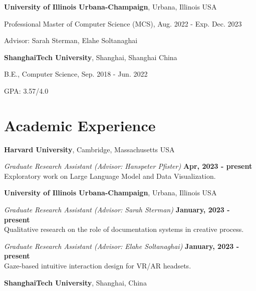 \documentclass[margin,line]{res}
\newenvironment{list1}{
  \begin{list}{\ding{113}}{%
      \setlength{\itemsep}{0in}
      \setlength{\parsep}{0in} \setlength{\parskip}{0in}
      \setlength{\topsep}{0in} \setlength{\partopsep}{0in} 
      \setlength{\leftmargin}{0.17in}}}{\end{list}}
\begin{document}
\begin{resume}
{\bf University of Illinois Urbana-Champaign}, Urbana, Illinois USA\\
\vspace*{-.1in}
\begin{list1}
\item[] Professional Master of Computer Science (MCS), Aug. 2022 - Exp. Dec. 2023
\vspace*{.025in}
\item[] Advisor:  Sarah Sterman, Elahe Soltanaghai
\end{list1}

{\bf ShanghaiTech University}, Shanghai, Shanghai China\\
\vspace*{-.1in}
\begin{list1}
\item[] B.E., Computer Science, Sep. 2018 - Jun. 2022
\vspace*{.025in}
\item[] GPA: 3.57/4.0
\end{list1}


\section{Academic Experience}

{\bf Harvard University}, Cambridge, Massachusetts USA

\vspace{-.2cm}
{\em Graduate Research Assistant (Advisor: Hanspeter Pfister)} \hfill {\bf Apr, 2023 - present}\\
Exploratory work on Large Language Model and Data Visualization.

{\bf University of Illinois Urbana-Champaign}, Urbana, Illinois USA

\vspace{-.2cm}
{\em Graduate Research Assistant (Advisor: Sarah Sterman)} \hfill {\bf January, 2023 - present}\\
Qualitative research on the role of documentation systems in creative process.

{\em Graduate Research Assistant (Advisor: Elahe Soltanaghai)} \hfill {\bf January, 2023 - present}\\
Gaze-based intuitive interaction design for VR/AR headsets.

{\bf ShanghaiTech University}, Shanghai, China


\end{resume}
\end{document}
